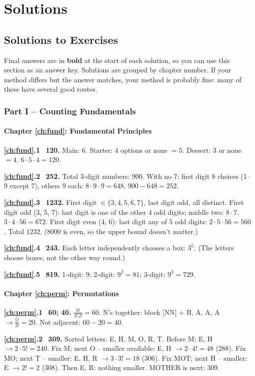 \documentclass[11pt,a4paper,openany]{report}
\newcommand{\solchapter}[2]{\subsection*{Chapter \ref*{#1}: #2}\def\solprefix{\ref*{#1}}}
\newcommand{\sol}[1]{\par\smallskip\textbf{\solprefix.#1}\ }
\begin{document}
\part*{Solutions}
\chapter*{Solutions to Exercises}
\small
Final answers are in \textbf{bold} at the start of each solution, so you can use this section as an answer key.
Solutions are grouped by chapter number. If your method differs but the answer matches, your method is probably fine: many of these have several good routes.

\section*{Part I -- Counting Fundamentals}

\solchapter{ch:fund}{Fundamental Principles}
\sol{1} \textbf{120.} Main: 6. Starter: 4 options or none $=5$. Dessert: 3 or none $=4$. $6\cdot5\cdot4=120$.

\sol{2} \textbf{252.} Total 3-digit numbers: 900. With no 7: first digit 8 choices (1--9 except 7), others 9 each: $8\cdot9\cdot9=648$. $900-648=252$.

\sol{3} \textbf{1232.} First digit $\in\{3,4,5,6,7\}$, last digit odd, all distinct.
First digit odd (3, 5, 7): last digit is one of the other 4 odd digits; middle two: $8\cdot7$. $3\cdot4\cdot56=672$.
First digit even (4, 6): last digit any of 5 odd digits: $2\cdot5\cdot56=560$. Total $1232$. (8000 is even, so the upper bound doesn't matter.)

\sol{4} \textbf{243.} Each letter independently chooses a box: $3^5$. (The letters choose boxes, not the other way round.)

\sol{5} \textbf{819.} 1-digit: 9; 2-digit: $9^2=81$; 3-digit: $9^3=729$.

\solchapter{ch:perm}{Permutations}
\sol{1} \textbf{60; 40.} $\frac{6!}{3!\,2!}=60$. N's together: block [NN] $+$ B, A, A, A $\to\frac{5!}{3!}=20$. Not adjacent: $60-20=40$.

\sol{2} \textbf{309.} Sorted letters: E, H, M, O, R, T. Before M: E, H $\to 2\cdot5!=240$.
Fix M; next O -- smaller available: E, H $\to2\cdot4!=48$ (288).
Fix MO; next T -- smaller: E, H, R $\to3\cdot3!=18$ (306).
Fix MOT; next H -- smaller: E $\to 2!=2$ (308). Then E, R: nothing smaller. MOTHER is next: 309.
\end{document}
